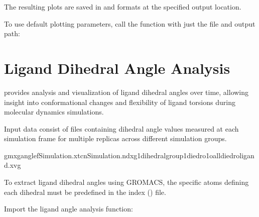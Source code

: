 \documentclass[a4paper,10pt,english]{sphinxmanual}
\begin{document}
\sphinxAtStartPar
The resulting plots are saved in  and  formats at the specified output location.

\sphinxAtStartPar
To use default plotting parameters, call the function with just the  file and output path:

\begin{sphinxVerbatim}[commandchars=\\\{\}]
 
\end{sphinxVerbatim}


\section{Ligand Dihedral Angle Analysis}
\label{\detokenize{Input:ligand-dihedral-angle-analysis}}
\sphinxAtStartPar
{} provides analysis and visualization of ligand dihedral angles over time, allowing insight into conformational changes and flexibility of ligand torsions during molecular dynamics simulations.

\sphinxAtStartPar
Input data consist of  files containing dihedral angle values measured at each simulation frame for multiple replicas across different simulation groups.

\begin{sphinxVerbatim}[commandchars=\\\{\}]
gmxgangle\PYGZhy{}fSimulation.xtc\PYGZhy{}nSimulation.ndx\PYGZhy{}g1dihedral\PYGZhy{}group1diedro\PYGZus{}1\PYGZhy{}oalldiedro\PYGZus{}ligand.xvg
\end{sphinxVerbatim}

\sphinxAtStartPar
{} To extract ligand dihedral angles using GROMACS, the specific atoms defining each dihedral must be pre\sphinxhyphen{}defined in the index () file.

\sphinxAtStartPar
{}

\sphinxAtStartPar
Import the ligand angle analysis function:

\begin{sphinxVerbatim}[commandchars=\\\{\}]
 
\end{sphinxVerbatim}
\end{document}
